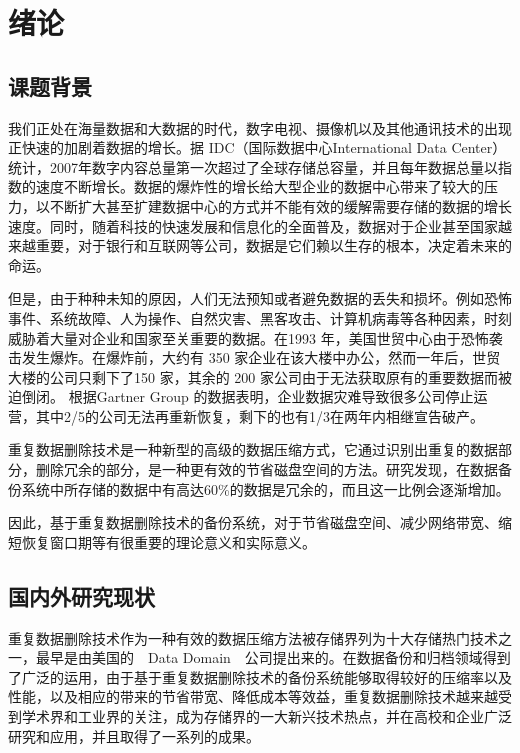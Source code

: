 \chapter{绪论}\thispagestyle{main}

\section{课题背景}

我们正处在海量数据和大数据的时代，数字电视、摄像机以及其他通讯技术的出现正快速的加剧着数据的增长。据 IDC（国际数据中心International Data Center）统计，2007年数字内容总量第一次超过了全球存储总容量，并且每年数据总量以指数的速度不断增长。数据的爆炸性的增长给大型企业的数据中心带来了较大的压力，以不断扩大甚至扩建数据中心的方式并不能有效的缓解需要存储的数据的增长速度。同时，随着科技的快速发展和信息化的全面普及，数据对于企业甚至国家越来越重要，对于银行和互联网等公司，数据是它们赖以生存的根本，决定着未来的命运。

但是，由于种种未知的原因，人们无法预知或者避免数据的丢失和损坏。例如恐怖事件、系统故障、人为操作、自然灾害、黑客攻击、计算机病毒等各种因素，时刻威胁着大量对企业和国家至关重要的数据。在1993 年，美国世贸中心由于恐怖袭击发生爆炸。在爆炸前，大约有 350 家企业在该大楼中办公，然而一年后，世贸大楼的公司只剩下了150 家，其余的 200 家公司由于无法获取原有的重要数据而被迫倒闭。 根据Gartner Group 的数据表明，企业数据灾难导致很多公司停止运营，其中2/5的公司无法再重新恢复，剩下的也有1/3在两年内相继宣告破产。

重复数据删除技术是一种新型的高级的数据压缩方式，它通过识别出重复的数据部分，删除冗余的部分，是一种更有效的节省磁盘空间的方法。研究发现，在数据备份系统中所存储的数据中有高达60\%的数据是冗余的，而且这一比例会逐渐增加。

因此，基于重复数据删除技术的备份系统，对于节省磁盘空间、减少网络带宽、缩短恢复窗口期等有很重要的理论意义和实际意义。


\section{国内外研究现状}

重复数据删除技术作为一种有效的数据压缩方法被存储界列为十大存储热门技术之一，最早是由美国的\ \ Data Domain\ \ 公司提出来的。在数据备份和归档领域得到了广泛的运用，由于基于重复数据删除技术的备份系统能够取得较好的压缩率以及性能，以及相应的带来的节省带宽、降低成本等效益，重复数据删除技术越来越受到学术界和工业界的关注，成为存储界的一大新兴技术热点，并在高校和企业广泛研究和应用，并且取得了一系列的成果。
